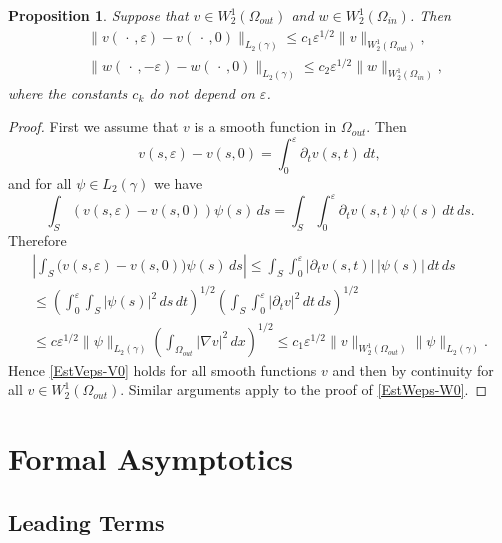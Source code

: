 \documentclass[reqno]{amsart}
\theoremstyle{plain}
\newtheorem{prop}{Proposition}
\numberwithin{equation}{section}
\newcommand{\eps}{\varepsilon}
\renewcommand{\leq}{\leqslant}
\begin{document}
\begin{prop}\label{PropTrace}
Suppose that $v\in W_2^{1}(\Omega_{out})$  and $w\in W_2^{1}(\Omega_{in})$. Then
\begin{align}\label{EstVeps-V0}
&\|v(\,\cdot\,,\eps)-v(\,\cdot\,,0)\|_{L_2(\gamma)}\leq
c_1\eps^{1/2}\|v\|_{W_2^1(\Omega_{out})}, \\\label{EstWeps-W0} &\|w(\,\cdot\,,-\eps)-w(\,\cdot\,,0)\|_{L_2(\gamma)}\leq
c_2\eps^{1/2}\|w\|_{W_2^1(\Omega_{in})},
\end{align}
where the constants $c_k$ do not depend on $\eps$.
\end{prop}
\begin{proof}
First we assume that $v$ is a smooth function in $\Omega_{out}$. Then
\begin{equation*}
 v(s,\eps)-v(s,0)=\int_0^\eps \partial_t v(s,t)\,dt,
\end{equation*}
and for all $\psi\in L_2(\gamma)$ we have
\begin{equation*}
\int_S(v(s,\eps)-v(s,0))\psi(s)\,ds=\int_S\int_0^\eps\partial_t v(s,t)\psi(s)\,dt\,ds.
\end{equation*}
Therefore
\begin{multline*}
\left|\int_S\big(v(s,\eps)-v(s,0)\big)\psi(s)\,ds\right|\leq
\int_S\int_0^\eps|\partial_t v(s,t)|\,|\psi(s)|\,dt\,ds
\\
\leq \left(\int_0^\eps \int_S|\psi(s)|^2\,ds\,dt\right)^{1/2}
\left(\int_S\int_0^\eps |\partial_t v|^2\,dt\,ds\right)^{1/2}
\\
\leq c\eps^{1/2}\|\psi\|_{L_2(\gamma)}
\left(\int_{\Omega_{out}}|\nabla v|^2\,dx\right)^{1/2}\leq c_1\eps^{1/2}\|v\|_{W_2^1(\Omega_{out})}\|\psi\|_{L_2(\gamma)}.
\end{multline*}
Hence \eqref{EstVeps-V0} holds for all smooth functions $v$ and then by continuity for all $v\in W_2^{1}(\Omega_{out})$.
Similar arguments apply to the proof of \eqref{EstWeps-W0}.
\end{proof}



\section{Formal Asymptotics}
\subsection{Leading Terms}
\label{Sec:LimitOperator}
\end{document}
